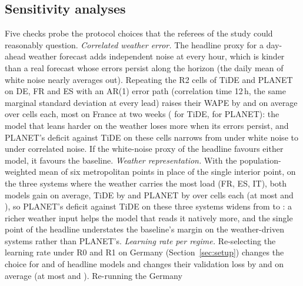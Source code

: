 \subsection{Sensitivity analyses}
\label{sec:sensitivity}
Five checks probe the protocol choices that the referees of the study could reasonably question.
\emph{Correlated weather error.} The headline proxy for a day-ahead weather forecast adds
independent noise at every hour, which is kinder than a real forecast whose errors persist along
the horizon (the daily mean of white noise nearly averages out). Repeating the R2 cells of TiDE
and PLANET on DE, FR and ES with an AR(1) error path (correlation time 12\,h, the same marginal
standard deviation at every lead) raises their WAPE by 
and  on average over  cells
each, most on France at two weeks ( for TiDE,
 for PLANET): the model that leans harder on the
weather loses more when its errors persist, and PLANET's deficit against TiDE on these cells
narrows from  under white noise to
 under correlated noise. If the white-noise proxy
of the headline favours either model, it favours the baseline.
\emph{Weather representation.} With the population-weighted mean of six metropolitan points in
place of the single interior point, on the three systems where the weather carries the most
load (FR, ES, IT), both models gain on average, TiDE by  and
PLANET by  over  cells each (at most
 and ), so PLANET's deficit
against TiDE on these three systems widens from  to
: a richer weather input helps the model that reads it
natively more, and the single point of the headline understates the baseline's margin on the
weather-driven systems rather than PLANET's.
\emph{Learning rate per regime.} Re-selecting the learning rate under R0 and R1 on Germany
(Section~\ref{sec:setup}) changes the choice for  and
 of  headline models and changes their validation
loss by  and  on average (at most
 and ). Re-running the Germany
